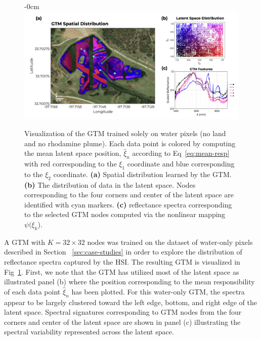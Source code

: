 \documentclass[remotesensing,article,submit,pdftex,moreauthors]{Definitions/mdpi}
\begin{document}
\begin{figure}[t]
\begin{adjustwidth}{-\extralength}{0cm}
\centering
\includegraphics[width=18.0cm]{paper/figures/results/gtm-water.png}
\end{adjustwidth}
\caption{Visualization of the GTM trained solely on water pixels (no land and no rhodamine plume). Each data point is colored by computing the mean latent space position, $\hat{\xi}_n$ according to Eq~\ref{eq:mean-resp} with red corresponding to the $\xi_1$ coordinate and blue corresponding to the $\xi_2$ coordinate. \textbf{(a)} Spatial distribution learned by the GTM. \textbf{(b)} The distribution of data in the latent space. Nodes corresponding to the four corners and center of the latent space are identified with cyan markers. \textbf{(c)} reflectance spectra corresponding to the selected GTM nodes computed via the nonlinear mapping $\psi(\xi_k$).\label{fig:gtm-water}}
\end{figure}  

A GTM with $K=32\times 32$ nodes was trained on the dataset of water-only pixels described in Section ~\ref{sec:case-studies} in order to explore the distribution of reflectance spectra captured by the HSI. The resulting GTM is visualized in Fig~\ref{fig:gtm-water}. First, we note that the GTM has utilized most of the latent space as illustrated panel (b) where the position corresponding to the mean responsibility of each data point $\hat{\xi}_n$ has been plotted. For this water-only GTM, the spectra appear to be largely clustered toward the left edge, bottom, and right edge of the latent space. Spectral signatures corresponding to GTM nodes from the four corners and center of the latent space are shown in panel (c) illustrating the spectral variability represented across the latent space. 
\end{document}
